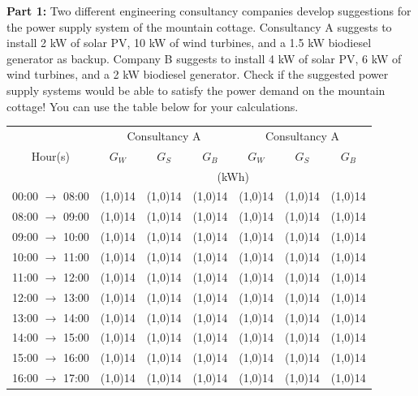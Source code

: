 \begin{kaobox}[frametitle=Task]
\textbf{Part 1:} Two different engineering consultancy companies develop suggestions for the power supply system of the mountain cottage. Consultancy A suggests to install 2 kW of solar PV, 10 kW of wind turbines, and a 1.5 kW biodiesel generator as backup. Company B suggests to install 4 kW of solar PV, 6 kW of wind turbines, and a 2 kW biodiesel generator. Check if the suggested power supply systems would be able to satisfy the power demand on the mountain cottage! You can use the table below for your calculations.

\begin{tabular}{ c c c c c c c }

	\toprule
	& \multicolumn{3}{c}{Consultancy A}& \multicolumn{3}{c}{Consultancy A}\\
	Hour(s) & $G_W$ & $G_S$ & $G_B$  & $G_W$  & $G_S$  & $G_B$   \\
	& \multicolumn{6}{c}{(kWh)}   \\
	\midrule
	00:00 $\rightarrow$ 08:00 & \line(1,0){14}& \line(1,0){14} & \line(1,0){14} & \line(1,0){14}& \line(1,0){14} & \line(1,0){14}\\
	08:00 $\rightarrow$ 09:00 & \line(1,0){14}& \line(1,0){14} & \line(1,0){14} & \line(1,0){14}& \line(1,0){14} & \line(1,0){14}\\
	09:00 $\rightarrow$ 10:00 & \line(1,0){14}& \line(1,0){14} & \line(1,0){14} & \line(1,0){14}& \line(1,0){14} & \line(1,0){14}\\
	10:00 $\rightarrow$ 11:00 & \line(1,0){14}& \line(1,0){14} & \line(1,0){14} & \line(1,0){14}& \line(1,0){14} & \line(1,0){14}\\
	11:00 $\rightarrow$ 12:00 & \line(1,0){14}& \line(1,0){14} & \line(1,0){14} & \line(1,0){14}& \line(1,0){14} & \line(1,0){14}\\
	12:00 $\rightarrow$ 13:00 & \line(1,0){14}& \line(1,0){14} & \line(1,0){14} & \line(1,0){14}& \line(1,0){14} & \line(1,0){14}\\
	13:00 $\rightarrow$ 14:00 & \line(1,0){14}& \line(1,0){14} & \line(1,0){14} & \line(1,0){14}& \line(1,0){14} & \line(1,0){14}\\
	14:00 $\rightarrow$ 15:00 & \line(1,0){14}& \line(1,0){14} & \line(1,0){14} & \line(1,0){14}& \line(1,0){14} & \line(1,0){14}\\
	15:00 $\rightarrow$ 16:00 & \line(1,0){14}& \line(1,0){14} & \line(1,0){14} & \line(1,0){14}& \line(1,0){14} & \line(1,0){14}\\
	16:00 $\rightarrow$ 17:00 & \line(1,0){14}& \line(1,0){14} & \line(1,0){14} & \line(1,0){14}& \line(1,0){14} & \line(1,0){14}\\

\end{tabular}
\end{kaobox}
